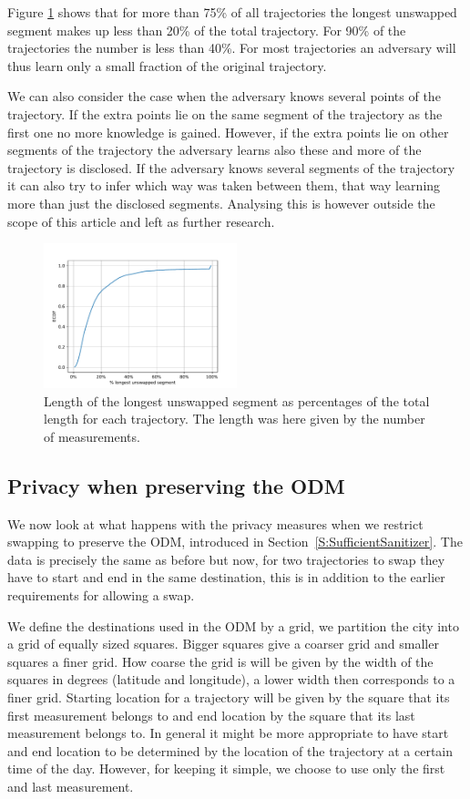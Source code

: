 \documentclass{llncs}
\begin{document}
Figure \ref{fig:ECDF-max-part} shows that for more than 75\% of all
trajectories the longest unswapped segment makes up less than 20\% of
the total trajectory. For 90\% of the trajectories the number is less
than 40\%. For most trajectories an adversary will thus learn only a
small fraction of the original trajectory.

We can also consider the case when the adversary knows several points
of the trajectory. If the extra points lie on the same segment of the
trajectory as the first one no more knowledge is gained. However, if
the extra points lie on other segments of the trajectory the adversary
learns also these and more of the trajectory is disclosed. If the
adversary knows several segments of the trajectory it can also try to
infer which way was taken between them, that way learning more than
just the disclosed segments. Analysing this is however outside the
scope of this article and left as further research.

\begin{figure}
  \center
  \includegraphics[width=0.5\textwidth]{figures/ECDF-max-part.pdf}
  \caption{Length of the longest unswapped segment as percentages of
    the total length for each trajectory. The length was here given by
    the number of measurements.}
  \label{fig:ECDF-max-part}
\end{figure}

\subsection{Privacy when preserving the ODM}\label{S:PrivacyODM}
We now look at what happens with the privacy measures when we restrict
swapping to preserve the ODM, introduced in Section~\ref{S:SufficientSanitizer}. The
data is precisely the same as before but now, for two trajectories to
swap they have to start and end in the same destination, this is in
addition to the earlier requirements for allowing a swap.

We define the destinations used in the ODM by a grid, we partition the
city into a grid of equally sized squares. Bigger squares give a
coarser grid and smaller squares a finer grid. How coarse the grid is
will be given by the width of the squares in degrees (latitude and
longitude), a lower width then corresponds to a finer grid. Starting
location for a trajectory will be given by the square that its first
measurement belongs to and end location by the square that its last
measurement belongs to. In general it might be more appropriate to
have start and end location to be determined by the location of the
trajectory at a certain time of the day. However, for keeping it
simple, we choose to use only the first and last measurement.
\end{document}
